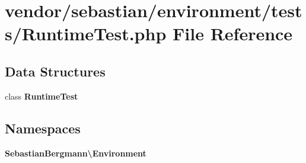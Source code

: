 \section{vendor/sebastian/environment/tests/\+Runtime\+Test.php File Reference}
\label{_runtime_test_8php}
\subsection*{Data Structures}
\begin{DoxyCompactItemize}
\item 
class {\bf Runtime\+Test}
\end{DoxyCompactItemize}
\subsection*{Namespaces}
\begin{DoxyCompactItemize}
\item 
 {\bf Sebastian\+Bergmann\textbackslash{}\+Environment}
\end{DoxyCompactItemize}

